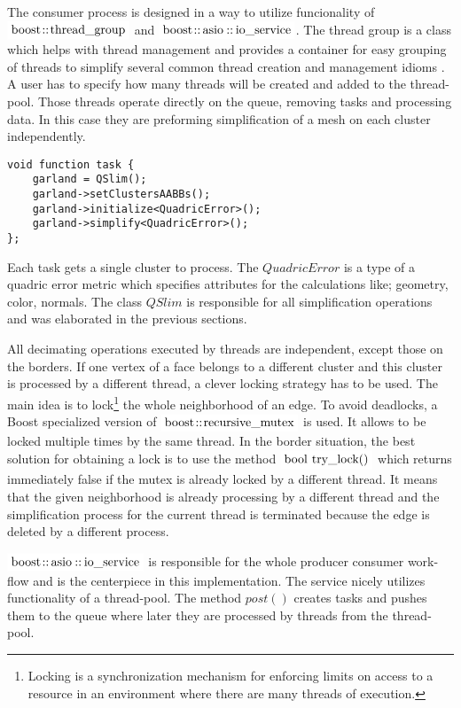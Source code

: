 The consumer process is designed in a way to utilize funcionality of $\inlinecode{Java}{boost::thread_group}$ and $\inlinecode{Java}{boost::asio::io_service}$. The thread group is a class which helps with thread management and provides a container for easy grouping of threads to simplify several common thread creation and management idioms \cite{boost03}. A user has to specify how many threads will be created and added to the thread-pool. Those threads operate directly on the queue, removing tasks and processing data. In this case they are preforming simplification of a mesh on each cluster independently.
\newline
\begin{center}
\begin{lstlisting}[caption={C style psuedocode of a task for a consumer.},captionpos=b]
void function task {
    garland = QSlim();
    garland->setClustersAABBs();
    garland->initialize<QuadricError>();
    garland->simplify<QuadricError>();
};
\end{lstlisting}
\end{center}

Each task gets a single cluster to process. The $QuadricError$ is a type of a quadric error metric which specifies attributes for the calculations like; geometry, color, normals. The class $QSlim$ is responsible for all simplification operations and was elaborated in the previous sections.

All decimating operations executed by threads are independent, except those on the borders. If one vertex of a face belongs to a different cluster and this cluster is processed by a different thread, a clever locking strategy has to be used. The main idea is to lock\footnote{Locking is a synchronization mechanism for enforcing limits on access to a resource in an environment where there are many threads of execution.} the whole neighborhood of an edge. To avoid deadlocks, a Boost specialized version of $\inlinecode{Java}{boost::recursive_mutex}$ is used. It allows to be locked multiple times by the same thread. In the border situation, the best solution for obtaining a lock is to use the method $\inlinecode{Java}{bool try_lock()}$ which returns immediately false if the mutex is already locked by a different thread. It means that the given neighborhood is already processing by a different thread and the simplification process for the current thread is terminated because the edge is deleted by a different process.

$\inlinecode{Java}{boost::asio::io_service}$ is responsible for the whole producer consumer work-flow and is the centerpiece in this implementation. The service nicely utilizes functionality of a thread-pool. The method $post()$ creates tasks and pushes them to the queue where later they are processed by threads from the thread-pool.

